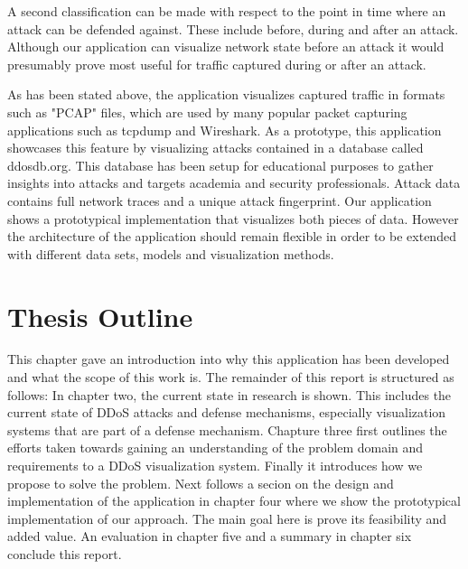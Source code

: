 A second classification can be made with respect to the point in time where an attack can be defended against. These include before, during and after an attack.
Although our application can visualize network state before an attack it would presumably prove most useful for traffic captured during or after an attack\cite{zargar}.

As has been stated above, the application visualizes captured traffic in formats such as "PCAP" files, which are used by many popular packet capturing applications such as tcpdump and Wireshark. As a prototype, this application showcases this feature by visualizing attacks contained in a database called ddosdb.org. This database has been setup for educational purposes to gather insights into attacks and targets academia and security professionals. Attack data contains full network traces and a unique attack fingerprint\cite{ddosdb}. Our application shows a prototypical implementation that visualizes both pieces of data. However the architecture of the application should remain flexible in order to be extended with different data sets, models and visualization methods.

\section{Thesis Outline}

This chapter gave an introduction into why this application has been developed and what the scope of this work is. The remainder of this report is structured as follows: In chapter two, the current state in research is shown. This includes the current state of DDoS attacks and defense mechanisms, especially visualization systems that are part of a defense mechanism. Chapture three first outlines the efforts taken towards gaining an understanding of the problem domain and requirements to a DDoS visualization system. Finally it introduces how we propose to solve the problem. Next follows a secion on the design and implementation of the application in chapter four where we show the prototypical implementation of our approach. The main goal here is prove its feasibility and added value. An evaluation in chapter five and a summary in chapter six conclude this report.